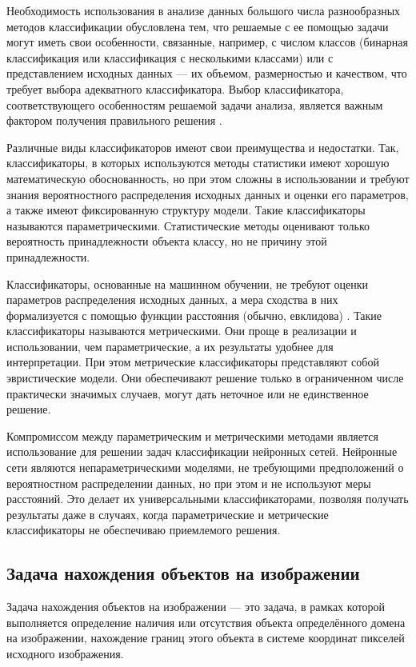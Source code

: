 Необходимость использования в анализе данных большого числа разнообразных методов классификации обусловлена тем, что решаемые с ее помощью задачи могут иметь свои особенности, связанные, например, с числом классов (бинарная классификация или классификация с несколькими классами) или с представлением исходных данных --- их объемом, размерностью и качеством, что требует выбора адекватного классификатора. Выбор классификатора, соответствующего особенностям решаемой задачи анализа, является важным фактором получения правильного решения \cite{choice}.

Различные виды классификаторов имеют свои преимущества и недостатки. Так, классификаторы, в которых используются методы статистики имеют хорошую математическую обоснованность, но при этом сложны в использовании и требуют знания вероятностного распределения исходных данных и оценки его параметров, а также имеют фиксированную структуру модели. Такие классификаторы называются параметрическими. Статистические методы оценивают только вероятность принадлежности объекта классу, но не причину этой принадлежности.

Классификаторы, основанные на машинном обучении, не требуют оценки параметров распределения исходных данных, а мера сходства в них формализуется с помощью функции расстояния (обычно, евклидова) \cite{euclidian}. Такие классификаторы называются метрическими. Они проще в реализации и использовании, чем параметрические, а их результаты удобнее для интерпретации. При этом метрические классификаторы представляют собой эвристические модели. Они обеспечивают решение только в ограниченном числе практически значимых случаев, могут дать неточное или не единственное решение.

Компромиссом между параметрическим и метрическими методами является использование для решении задач классификации нейронных сетей. Нейронные сети являются непараметрическими моделями, не требующими предположений о вероятностном распределении данных, но при этом и не используют меры расстояний. Это делает их универсальными классификаторами, позволяя получать результаты даже в случаях, когда параметрические и метрические классификаторы не обеспечиваю приемлемого решения.

\subsection{Задача нахождения объектов на изображении}

Задача нахождения объектов на изображении --- это задача, в рамках которой выполняется определение наличия или отсутствия объекта определённого домена на изображении, нахождение границ этого объекта в системе координат пикселей исходного изображения. 


